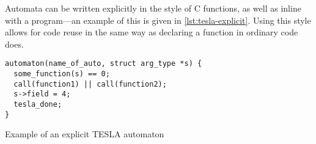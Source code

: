 Automata can be written explicitly in the style of C functions, as well
as inline with a program---an example of this is given in
\autoref{lst:tesla-explicit}. Using this style allows for code reuse in
the same way as declaring a function in ordinary code does.

\begin{listing}[ht]
  \begin{verbatim}
automaton(name_of_auto, struct arg_type *s) {
  some_function(s) == 0;
  call(function1) || call(function2);
  s->field = 4;
  tesla_done;
}
  \end{verbatim}
  \caption{Example of an explicit TESLA automaton}
  \label{lst:tesla-explicit}
\end{listing}

